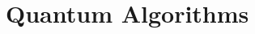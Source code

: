 \documentclass[sigplan,review]{acmart}
\theoremstyle{definition}
\begin{document}

\section{Quantum Algorithms} 
\label{sec2}
 
\begin{comment}
\begin{figure}[t]
  \centering
\begin{tikzpicture}[scale=1.2]
   \begin{yquant*}
   qubit {$\ket0$} x;
   qubit {$\ket1$} y;
   box {$H$} x;
   box {$H$} y;
   box {$U_f$} (x,y);
   measure y;
   box {$H$} x;
   measure x;
  \end{yquant*}
\end{tikzpicture}
\caption{\label{fig:deutsch}Quantum Circuit for the Deutsch-Jozsa
  Algorithm $(n=1)$}
\end{figure}
\end{comment}
\end{document}
